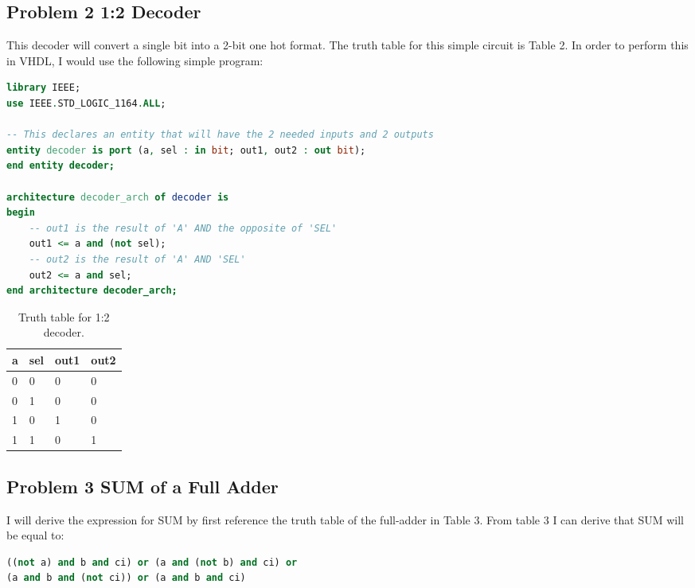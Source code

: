 \documentclass[11pt]{article}
\begin{document}
\subsection{Problem 2 1:2 Decoder}

This decoder will convert a single bit into a 2-bit one hot format. The truth table for this simple circuit is Table 2. In order to perform this in VHDL, I would use the following simple program:

\begin{lstlisting}[language=VHDL]
library IEEE;
use IEEE.STD_LOGIC_1164.ALL;

-- This declares an entity that will have the 2 needed inputs and 2 outputs	
entity decoder is port (a, sel : in bit; out1, out2 : out bit);
end entity decoder;

architecture decoder_arch of decoder is
begin
	-- out1 is the result of 'A' AND the opposite of 'SEL'
	out1 <= a and (not sel);
	-- out2 is the result of 'A' AND 'SEL'
	out2 <= a and sel;
end architecture decoder_arch;	
\end{lstlisting}

\begin{table}[h]
\begin{center}
	\begin{tabular}{| l | l | l | l |}
		\hline
		a & sel & out1 & out2 \\ \hline
		0 & 0 & 0 & 0 \\ \hline 
		0 & 1 & 0 & 0 \\ \hline
		1 & 0 & 1 & 0 \\ \hline
		1 & 1 & 0 & 1 \\ \hline
	\end{tabular}
	\caption{\label{tab:table-name}Truth table for 1:2 decoder.}
\end{center}	
\end{table}

\subsection{Problem 3 SUM of a Full Adder}

I will derive the expression for SUM by first reference the truth table of the full-adder in Table 3. From table 3 I can derive that SUM will be equal to:

\begin{lstlisting}[language=VHDL]
((not a) and b and ci) or (a and (not b) and ci) or 
(a and b and (not ci)) or (a and b and ci)
\end{lstlisting}
\end{document}
